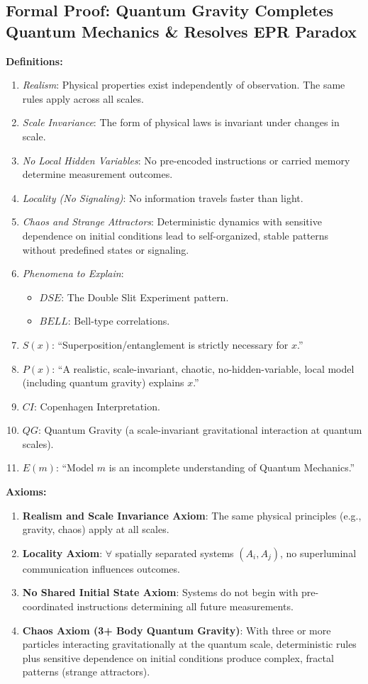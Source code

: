 \documentclass{article}
\begin{document}
\subsection*{Formal Proof: Quantum Gravity Completes Quantum Mechanics \& Resolves EPR Paradox}
\textbf{Definitions:}
\begin{enumerate}
    \item \emph{Realism}: Physical properties exist independently of observation. The same rules apply across all scales.
    \item \emph{Scale Invariance}: The form of physical laws is invariant under changes in scale.
    \item \emph{No Local Hidden Variables}: No pre-encoded instructions or carried memory determine measurement outcomes.
    \item \emph{Locality (No Signaling)}: No information travels faster than light.
    \item \emph{Chaos and Strange Attractors}: Deterministic dynamics with sensitive dependence on initial conditions lead to self-organized, stable patterns without predefined states or signaling.
    \item \emph{Phenomena to Explain}: 
    \begin{itemize}
        \item $DSE$: The Double Slit Experiment pattern.
        \item $BELL$: Bell-type correlations.
    \end{itemize}
    \item $S(x)$: “Superposition/entanglement is strictly necessary for $x$.”
    \item $P(x)$: “A realistic, scale-invariant, chaotic, no-hidden-variable, local model (including quantum gravity) explains $x$.”
    \item $CI$: Copenhagen Interpretation.
    \item $QG$: Quantum Gravity (a scale-invariant gravitational interaction at quantum scales).
    \item $E(m)$: “Model $m$ is an incomplete understanding of Quantum Mechanics.”
\end{enumerate}

\textbf{Axioms:}
\begin{enumerate}
    \item \textbf{Realism and Scale Invariance Axiom}: The same physical principles (e.g., gravity, chaos) apply at all scales.
    \item \textbf{Locality Axiom}: $\forall$ spatially separated systems $(A_i,A_j)$, no superluminal communication influences outcomes.
    \item \textbf{No Shared Initial State Axiom}: Systems do not begin with pre-coordinated instructions determining all future measurements.
    \item \textbf{Chaos Axiom (3+ Body Quantum Gravity)}: With three or more particles interacting gravitationally at the quantum scale, deterministic rules plus sensitive dependence on initial conditions produce complex, fractal patterns (strange attractors).
\end{enumerate}
\end{document}
